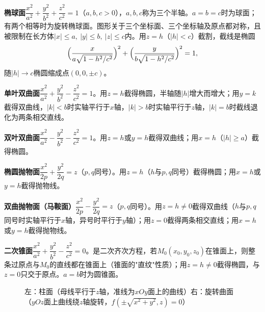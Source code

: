 \textbf{椭球面}\quad $\dfrac{x^{2}}{a^{2}}+\dfrac{y^{2}}{b^{2}}+\dfrac{z^{2}}{c^{2}}=1$（$a,b,c>0$），$a,b,c$称为三个半轴。$a=b=c$时为球面；有两个相等时为旋转椭球面。图形关于三个坐标面、三个坐标轴及原点都对称，且被限制在长方体$|x|\le a,\ |y|\le b,\ |z|\le c$内。用$z=h$（$|h|<c$）截割，截线是椭圆
\[
\Bigl(\frac{x}{a\sqrt{1-h^{2}/c^{2}}}\Bigr)^{2}+\Bigl(\frac{y}{b\sqrt{1-h^{2}/c^{2}}}\Bigr)^{2}=1,
\]
随$|h|\to c$椭圆缩成点$(0,0,\pm c)$。

\textbf{单叶双曲面}\quad $\dfrac{x^{2}}{a^{2}}+\dfrac{y^{2}}{b^{2}}-\dfrac{z^{2}}{c^{2}}=1$。用$z=h$截得椭圆，半轴随$|h|$增大而增大；用$y=k$截得双曲线，$|k|<b$时实轴平行于$x$轴，$|k|>b$时实轴平行于$z$轴，$|k|=b$时截线退化为两条相交直线。

\textbf{双叶双曲面}\quad $\dfrac{x^{2}}{a^{2}}-\dfrac{y^{2}}{b^{2}}-\dfrac{z^{2}}{c^{2}}=1$。用$z=h$或$y=h$截得双曲线；用$x=h$（$|h|\ge a$）截得椭圆。

\textbf{椭圆抛物面}\quad $\dfrac{x^{2}}{2p}+\dfrac{y^{2}}{2q}=z$（$p,q$同号）。用$z=h$（$h$与$p,q$同号）截得椭圆；用$x=h$或$y=h$截得抛物线。

\textbf{双曲抛物面（马鞍面）}\quad $\dfrac{x^{2}}{2p}-\dfrac{y^{2}}{2q}=z$（$p,q$同号）。用$z=h\ne0$截得双曲线（$h$与$p,q$同号时实轴平行于$x$轴，异号时平行于$y$轴）；用$z=0$截得两条相交直线；用$x=h$或$y=h$截得抛物线。

\textbf{二次锥面}\quad $\dfrac{x^{2}}{a^{2}}+\dfrac{y^{2}}{b^{2}}-\dfrac{z^{2}}{c^{2}}=0$。是二次齐次方程，若$M_0(x_0,y_0,z_0)$在锥面上，则整条过原点与$M_0$的直线都在锥面上（锥面的"直纹"性质）；用$z=h\ne0$截得椭圆，与$z=0$只交于原点。$a=b$时为圆锥面。

\begin{figure}[htbp]
\centering
{}\hfill
{}
\caption{左：柱面（母线平行于$z$轴，准线为$xOy$面上的曲线）\quad 右：旋转曲面（$yOz$面上曲线绕$z$轴旋转，$f(\pm\sqrt{x^2+y^2},z)=0$）}
\end{figure}

